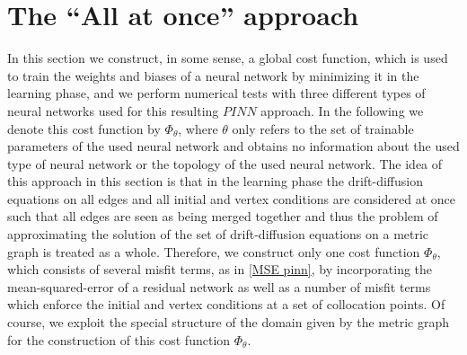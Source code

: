 \section{The “All at once” approach}
\label{ch3:sec1}

In this section we construct, in some sense, a global cost function, which is used to train the weights and biases of a neural network by minimizing it in the learning phase, and we perform numerical tests with three different types of neural networks used for this resulting $PINN$ approach. In the following we denote this cost function by $\Phi_\theta$, where $\theta$ only refers to the set of trainable parameters of the used neural network and obtains no information about the used type of neural network or the topology of the used neural network. The idea of this approach in this section is that in the learning phase the drift-diffusion equations on all edges and all initial and vertex conditions are considered at once such that all edges are seen as being merged together and thus the problem of approximating the solution of the set of drift-diffusion equations on a metric graph is treated as a whole. Therefore, we construct only one cost function $\Phi_\theta$, which consists of several misfit terms, as in \cref{MSE pinn}, by incorporating the mean-squared-error of a residual network as well as a number of misfit terms which enforce the initial and vertex conditions at a set of collocation points. Of course, we exploit the special structure of the domain given by the metric graph for the construction of this cost function $\Phi_\theta$. \\

